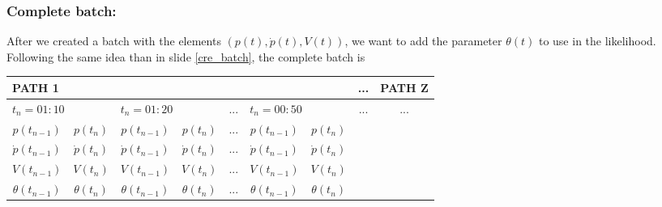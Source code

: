 \documentclass[aspectratio=169]{beamer}\usepackage[utf8]{inputenc}
\begin{document}
\begin{frame}\frametitle{Complete batch:}

After we created a batch with the elements $(p(t),\dot{p}(t),V(t))$, we want to add the parameter $\theta(t)$ to use in the likelihood. Following the same idea than in slide {\color{blue}\ref{cre_batch}}, the complete batch is
\begin{table}[]
\begin{tabular}{|c|c|c|c|c|c|c|c|c|}
\hline
\multicolumn{7}{|l|}{PATH 1}                                                                                       & ...                  & PATH Z               \\ \hline
\multicolumn{2}{|l|}{$t_n=01:10$}   & \multicolumn{2}{l|}{$t_n=01:20$}    & ... & \multicolumn{2}{l|}{$t_n=00:50$} & \multirow{4}{*}{...} & \multirow{4}{*}{...} \\ \cline{1-7}
$p(t_{n-1})$      & $p(t_{n})$      & $p(t_{n-1})$      & $p(t_{n})$      & ... & $p(t_{n-1})$     & $p(t_{n})$    &                      &                      \\ \cline{1-7}
$\dot{p}(t_{n-1})$ & $\dot{p}(t_{n})$ & $\dot{p}(t_{n-1})$ & $\dot{p}(t_{n})$ & ... & $\dot{p}(t_{n-1})$     & $\dot{p}(t_{n})$    &                      &                      \\ \cline{1-7}

$V(t_{n-1})$      & $V(t_{n})$      & $V(t_{n-1})$      & $V(t_{n})$      & ... & $V(t_{n-1})$     & $V(t_{n})$    &                      &                      \\ \hline
$\theta(t_{n-1})$      & $\theta(t_{n})$      & $\theta(t_{n-1})$      & $\theta(t_{n})$      & ... & $\theta(t_{n-1})$     & $\theta(t_{n})$    &                      &                      \\ \hline

\end{tabular}
\end{table}
\begin{center}
\begin{tabular}{|c|}
\toprule
{\tiny

}\\
\bottomrule
\end{tabular}
\end{center}

\end{frame}
\end{document}
